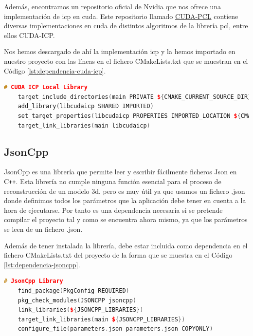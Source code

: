 Además, encontramos un repositorio oficial de Nvidia que nos ofrece una implementación de \gls{icp} en \gls{cuda}.
Este repositorio llamado \href{https://github.com/NVIDIA-AI-IOT/cuda-pcl}{CUDA-PCL} contiene diversas implementaciones en \gls{cuda} de distintos algoritmos de la librería \gls{pcl}, entre ellos CUDA-ICP.

Nos hemos descargado de ahí la implementación \gls{icp} y la hemos importado en nuestro proyecto con las líneas en el fichero CMakeLists.txt que se muestran en el Código \ref{lst:dependencia-cuda-icp}.

\begin{lstlisting}[language={C++}, caption={Dependencia CMakeLists: CUDA-ICP}, label={lst:dependencia-cuda-icp}]
    # CUDA ICP Local Library
    target_include_directories(main PRIVATE ${CMAKE_CURRENT_SOURCE_DIR})
    add_library(libcudaicp SHARED IMPORTED)
    set_target_properties(libcudaicp PROPERTIES IMPORTED_LOCATION ${CMAKE_CURRENT_SOURCE_DIR}/lib/libcudaicp.so)
    target_link_libraries(main libcudaicp)
\end{lstlisting}

\subsection{JsonCpp}

JsonCpp es una librería que permite leer y escribir fácilmente ficheros Json en C\texttt{++}.
Esta librería no cumple ninguna función esencial para el proceso de reconstrucción de un modelo \gls{3d}, pero es muy útil ya que usamos un fichero .json donde definimos todos los parámetros que la aplicación debe tener en cuenta a la hora de ejecutarse.
Por tanto es una dependencia necesaria si se pretende compilar el proyecto tal y como se encuentra ahora mismo, ya que los parámetros se leen de un fichero .json.

Además de tener instalada la librería, debe estar incluida como dependencia en el fichero CMakeLists.txt del proyecto de la forma que se muestra en el Código \ref{lst:dependencia-jsoncpp}.

\begin{lstlisting}[language={C++}, caption={Dependencia CMakeLists: JsonCpp}, label={lst:dependencia-jsoncpp}]
    # JsonCpp Library
    find_package(PkgConfig REQUIRED)
    pkg_check_modules(JSONCPP jsoncpp)
    link_libraries(${JSONCPP_LIBRARIES})
    target_link_libraries(main ${JSONCPP_LIBRARIES})
    configure_file(parameters.json parameters.json COPYONLY)
\end{lstlisting}

